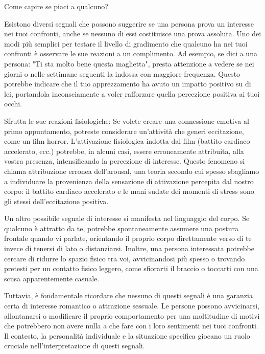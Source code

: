 \documentclass[12pt]{book} %
\begin{document}
\begin{mdframed}[linewidth=1pt]
Come capire se piaci a qualcuno?

Esistono diversi segnali che possono suggerire se una persona prova un interesse nei tuoi confronti, anche se nessuno di essi costituisce una prova assoluta. Uno dei modi più semplici per testare il livello di gradimento che qualcuno ha nei tuoi confronti è osservare le sue reazioni a un complimento. Ad esempio, se dici a una persona: "Ti sta molto bene questa maglietta", presta attenzione a vedere se nei giorni o nelle settimane seguenti la indossa con maggiore frequenza. Questo potrebbe indicare che il tuo apprezzamento ha avuto un impatto positivo su di lei, portandola inconsciamente a voler rafforzare quella percezione positiva ai tuoi occhi.

Sfrutta le sue reazioni fisiologiche: Se volete creare una connessione emotiva al primo appuntamento, potreste considerare un'attività che generi eccitazione, come un film horror. L'attivazione fisiologica indotta dal film (battito cardiaco accelerato, ecc.) potrebbe, in alcuni casi, essere erroneamente attribuita, alla vostra presenza, intensificando la percezione di interesse. Questo fenomeno si chiama
attribuzione erronea dell'arousal, una teoria secondo cui spesso sbagliamo a individuare la provenienza della
sensazione di attivazione percepita dal nostro corpo: il battito cardiaco accelerato e le mani sudate dei momenti di
stress sono gli stessi dell'eccitazione positiva.

Un altro possibile segnale di interesse si manifesta nel linguaggio del corpo. Se qualcuno è attratto da te, potrebbe spontaneamente assumere una postura frontale quando vi parlate, orientando il proprio corpo direttamente verso di te invece di tenersi di lato o distanziarsi. Inoltre, una persona interessata potrebbe cercare di ridurre lo spazio fisico tra voi, avvicinandosi più spesso o trovando pretesti per un contatto fisico leggero, come sfiorarti il braccio o toccarti con una scusa apparentemente casuale.

Tuttavia, è fondamentale ricordare che nessuno di questi segnali è una garanzia certa di interesse romantico o attrazione sessuale. Le persone possono avvicinarsi, allontanarsi o modificare il proprio comportamento per una moltitudine di motivi che potrebbero non avere nulla a che fare con i loro sentimenti nei tuoi confronti. Il contesto, la personalità individuale e la situazione specifica giocano un ruolo cruciale nell’interpretazione di questi segnali.
\end{mdframed}
\end{document}
